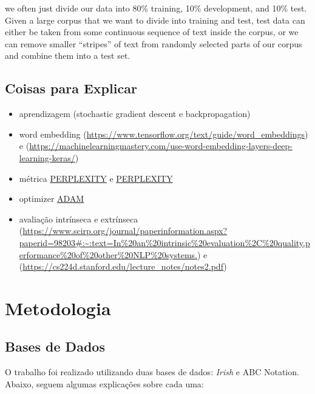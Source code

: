 \documentclass{automatextcc}
\begin{document}
we often just divide our data into 80\% training, 10\% development, and 10\% test. Given a large corpus that we want to divide into training and test, test data can either be taken from some continuous sequence of text inside the corpus, or we can remove smaller “stripes” of text from randomly selected parts of our corpus and combine them into a test set.

\citep{jurafsky2021}

\section{Coisas para Explicar}

\begin{itemize}
    \item aprendizagem (stochastic gradient descent e backpropagation)
    \item word embedding (\url{https://www.tensorflow.org/text/guide/word_embeddings}) e (\url{https://machinelearningmastery.com/use-word-embedding-layers-deep-learning-keras/})
    \item métrica \href{https://thegradient.pub/understanding-evaluation-metrics-for-language-models/}{PERPLEXITY} e \href{https://huggingface.co/docs/transformers/perplexity}{PERPLEXITY}
    \item optimizer \href{https://machinelearningmastery.com/adam-optimization-algorithm-for-deep-learning/}{ADAM}
    \item avaliação intrínseca e extrínseca (\url{https://www.scirp.org/journal/paperinformation.aspx?paperid=98203#:~:text=In\%20an\%20intrinsic\%20evaluation\%2C\%20quality,performance\%20of\%20other\%20NLP\%20systems.}) e (\url{https://cs224d.stanford.edu/lecture_notes/notes2.pdf})
\end{itemize}

\chapter{Metodologia}

\section{Bases de Dados}



O trabalho foi realizado utilizando duas bases de dados: \textit{Irish} e {ABC Notation}. Abaixo, seguem algumas explicações sobre cada uma:
\end{document}

